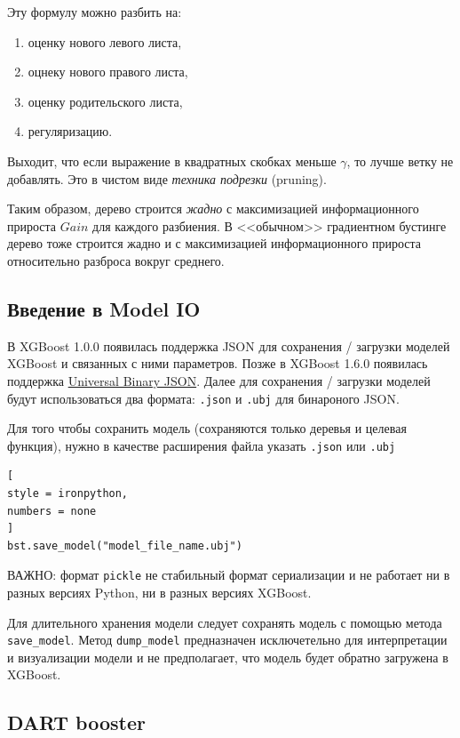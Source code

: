 \documentclass[%
	11pt,
	a4paper,
	utf8,
		]{article}
\begin{document}
Эту формулу можно разбить на:
\begin{enumerate}
	\item оценку нового левого листа,
	
	\item оцнеку нового правого листа,
	
	\item оценку родительского листа,
	
	\item регуляризацию.
\end{enumerate}

Выходит, что если выражение в квадратных скобках меньше $ \gamma $, то лучше ветку не добавлять. Это в чистом виде \emph{техника подрезки} (pruning).

Таким образом, дерево строится \emph{жадно} с максимизацией информационного прироста $ Gain $ для каждого разбиения. В <<обычном>> градиентном бустинге дерево тоже строится жадно и с максимизацией информационного прироста относительно разброса вокруг среднего.

\subsection{Введение в Model IO}

В XGBoost 1.0.0 появилась поддержка JSON для сохранения / загрузки моделей XGBoost и связанных с ними параметров. Позже в XGBoost 1.6.0 появилась поддержка \href{https://ubjson.org/}{Universal Binary JSON}. Далее для сохранения / загрузки моделей будут использоваться два формата: \verb|.json| и \verb|.ubj| для бинароного JSON.

Для того чтобы сохранить модель (сохраняются только деревья и целевая функция), нужно в качестве расширения файла указать \verb|.json| или \verb|.ubj|
\begin{lstlisting}[
style = ironpython,
numbers = none
]
bst.save_model("model_file_name.ubj")
\end{lstlisting}

ВАЖНО: формат \verb|pickle| не стабильный формат сериализации и не работает ни в разных версиях Python, ни в разных версиях XGBoost.

Для длительного хранения модели следует сохранять модель с помощью метода \verb|save_model|. Метод \verb|dump_model| предназначен исключетельно для интерпретации и визуализации модели и не предполагает, что модель будет обратно загружена в XGBoost.

\subsection{DART booster}
\end{document}
